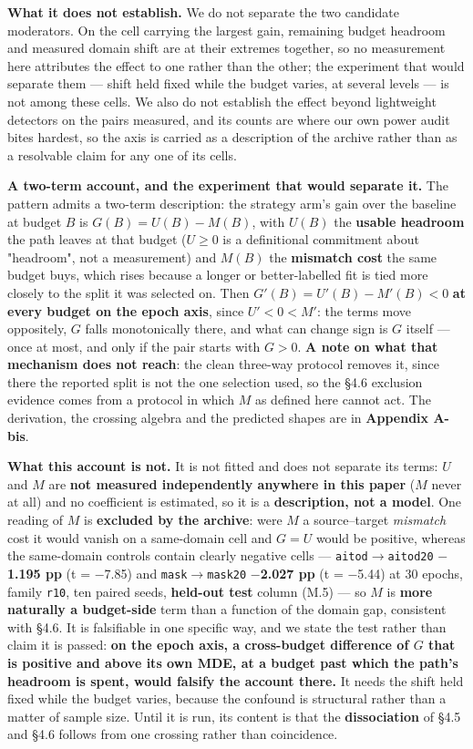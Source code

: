 \documentclass[pdflatex,sn-mathphys-ay]{sn-jnl}
\begin{document}
\textbf{What it does not establish.} We do not separate the two candidate moderators. On the cell carrying the largest gain, remaining budget headroom and measured domain shift are at their extremes together, so no measurement here attributes the effect to one rather than the other; the experiment that would separate them --- shift held fixed while the budget varies, at several levels --- is not among these cells. We also do not establish the effect beyond lightweight detectors on the pairs measured, and its counts are where our own power audit bites hardest, so the axis is carried as a description of the archive rather than as a resolvable claim for any one of its cells.

\textbf{A two-term account, and the experiment that would separate it.} The pattern admits a two-term description: the strategy arm's gain over the baseline at budget $B$ is $G(B)=U(B)-M(B)$, with $U(B)$ the \textbf{usable headroom} the path leaves at that budget ($U\ge0$ is a definitional commitment about "headroom", not a measurement) and $M(B)$ the \textbf{mismatch cost} the same budget buys, which rises because a longer or better-labelled fit is tied more closely to the split it was selected on. Then $G'(B)=U'(B)-M'(B)<0$ \textbf{at every budget on the epoch axis}, since $U'<0<M'$: the terms move oppositely, $G$ falls monotonically there, and what can change sign is $G$ itself --- once at most, and only if the pair starts with $G>0$. \textbf{A note on what that mechanism does not reach}: the clean three-way protocol removes it, since there the reported split is not the one selection used, so the \S{}4.6 exclusion evidence comes from a protocol in which $M$ as defined here cannot act. The derivation, the crossing algebra and the predicted shapes are in \textbf{Appendix A-bis}.

\textbf{What this account is not.} It is not fitted and does not separate its terms: $U$ and $M$ are \textbf{not measured independently anywhere in this paper} ($M$ never at all) and no coefficient is estimated, so it is a \textbf{description, not a model}. One reading of $M$ is \textbf{excluded by the archive}: were $M$ a source--target \emph{mismatch} cost it would vanish on a same-domain cell and $G=U$ would be positive, whereas the same-domain controls contain clearly negative cells --- \texttt{aitod\ensuremath{\rightarrow}aitod20} \textbf{\ensuremath{-}1.195 pp} (t = \ensuremath{-}7.85) and \texttt{mask\ensuremath{\rightarrow}mask20} \textbf{\ensuremath{-}2.027 pp} (t = \ensuremath{-}5.44) at 30 epochs, family \texttt{r10}, ten paired seeds, \textbf{held-out test} column (M.5) --- so $M$ is \textbf{more naturally a budget-side} term than a function of the domain gap, consistent with \S{}4.6. It is falsifiable in one specific way, and we state the test rather than claim it is passed: \textbf{on the epoch axis, a cross-budget difference of $G$ that is positive and above its own MDE, at a budget past which the path's headroom is spent, would falsify the account there.} It needs the shift held fixed while the budget varies, because the confound is structural rather than a matter of sample size. Until it is run, its content is that the \textbf{dissociation} of \S{}4.5 and \S{}4.6 follows from one crossing rather than coincidence.
\end{document}
